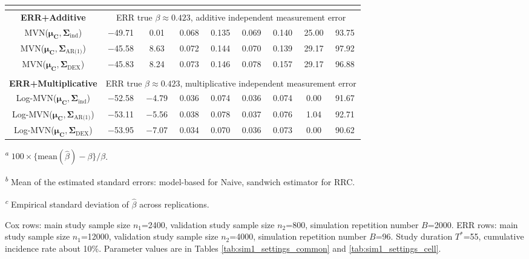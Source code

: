 \begin{table}[!htbp]
\begin{minipage}{\textwidth}
\begin{tabular}{|c|c|c|c|c|c|c|c|c|}
\hline
\multicolumn{9}{|c|}{}\\
\hline
\bf ERR+Additive & \multicolumn{8}{c|}{ERR true $\beta\approx 0.423$, additive independent measurement error} \\
\hline
MVN($\bm{\mu_C},\bm{\Sigma}_{\text{ind}}$) & $-$49.71 & 0.01 & 0.068 & 0.135 & 0.069 & 0.140 & 25.00 & 93.75 \\
\hline
MVN($\bm{\mu_C},\bm{\Sigma}_{\text{AR(1)}}$) & $-$45.58 & 8.63 & 0.072 & 0.144 & 0.070 & 0.139 & 29.17 & 97.92 \\
\hline
MVN($\bm{\mu_C},\bm{\Sigma}_{\text{DEX}}$) & $-$45.83 & 8.24 & 0.073 & 0.146 & 0.078 & 0.157 & 29.17 & 96.88 \\
\hline
\multicolumn{9}{|c|}{}\\
\hline
\bf ERR+Multiplicative & \multicolumn{8}{c|}{ERR true $\beta\approx 0.423$, multiplicative independent measurement error} \\
\hline
Log-MVN($\bm{\mu_C},\bm{\Sigma}_{\text{ind}}$) & $-$52.58 & $-$4.79 & 0.036 & 0.074 & 0.036 & 0.074 & 0.00 & 91.67 \\
\hline
Log-MVN($\bm{\mu_C},\bm{\Sigma}_{\text{AR(1)}}$) & $-$53.11 & $-$5.56 & 0.038 & 0.078 & 0.037 & 0.076 & 1.04 & 92.71 \\
\hline
Log-MVN($\bm{\mu_C},\bm{\Sigma}_{\text{DEX}}$) & $-$53.95 & $-$7.07 & 0.034 & 0.070 & 0.036 & 0.073 & 0.00 & 90.62 \\
\hline
\end{tabular}
\par
{\raggedright\footnotesize
\begin{list}{}{\setlength{\leftmargin}{1.2em}\setlength{\labelwidth}{0.8em}\setlength{\labelsep}{0.4em}%
  \setlength{\itemsep}{0pt}\setlength{\parsep}{0pt}\setlength{\topsep}{4pt}\setlength{\partopsep}{0pt}}
\item[\textsuperscript{\textit{a}}] $100\times\{\text{mean}(\hat{\beta})-\beta\}/\beta$.
\item[\textsuperscript{\textit{b}}] Mean of the estimated standard errors: model-based for Naive, sandwich estimator for RRC.
\item[\textsuperscript{\textit{c}}] Empirical standard deviation of $\hat{\beta}$ across replications.
\item[] Cox rows: main study sample size $n_1$=2400, validation study sample size $n_2$=800, simulation repetition number $B$=2000. ERR rows: main study sample size $n_1$=12000, validation study sample size $n_2$=4000, simulation repetition number $B$=96. Study duration $T^{*}$=55, cumulative incidence rate about 10\%. Parameter values are in Tables \ref{tab:sim1_settings_common} and \ref{tab:sim1_settings_cell}.
\end{list}
\par}
\end{minipage}
\label{tab:sim1}
\end{table}
